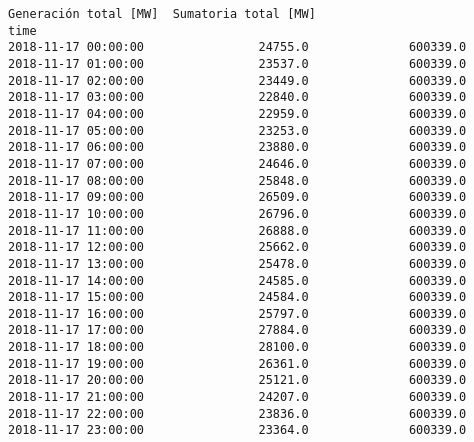 \documentclass[11pt]{article}
\begin{document}
\begin{tcolorbox}[breakable, size=fbox, boxrule=.5pt, pad at break*=1mm, opacityfill=0]
\begin{Verbatim}[commandchars=\\\{\}]
                     Generación total [MW]  Sumatoria total [MW]
time
2018-11-17 00:00:00                24755.0              600339.0
2018-11-17 01:00:00                23537.0              600339.0
2018-11-17 02:00:00                23449.0              600339.0
2018-11-17 03:00:00                22840.0              600339.0
2018-11-17 04:00:00                22959.0              600339.0
2018-11-17 05:00:00                23253.0              600339.0
2018-11-17 06:00:00                23880.0              600339.0
2018-11-17 07:00:00                24646.0              600339.0
2018-11-17 08:00:00                25848.0              600339.0
2018-11-17 09:00:00                26509.0              600339.0
2018-11-17 10:00:00                26796.0              600339.0
2018-11-17 11:00:00                26888.0              600339.0
2018-11-17 12:00:00                25662.0              600339.0
2018-11-17 13:00:00                25478.0              600339.0
2018-11-17 14:00:00                24585.0              600339.0
2018-11-17 15:00:00                24584.0              600339.0
2018-11-17 16:00:00                25797.0              600339.0
2018-11-17 17:00:00                27884.0              600339.0
2018-11-17 18:00:00                28100.0              600339.0
2018-11-17 19:00:00                26361.0              600339.0
2018-11-17 20:00:00                25121.0              600339.0
2018-11-17 21:00:00                24207.0              600339.0
2018-11-17 22:00:00                23836.0              600339.0
2018-11-17 23:00:00                23364.0              600339.0
\end{Verbatim}
\end{tcolorbox}
        
\end{document}
